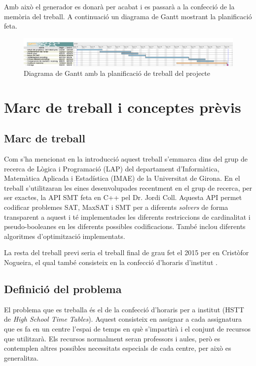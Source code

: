 \documentclass[11pt,a4paper,twoside]{report}
\begin{document}
  Amb això el generador es donarà per acabat i es passarà a la confecció de la memòria del treball. 
  A continuació un diagrama de Gantt mostrant la planificació feta.



  \begin{figure}
    \centering
    \includegraphics[angle=90,origin=c,height=0.58\textheight]{Diagrames/gantt1.png} 
    \caption{Diagrama de Gantt amb la planificació de treball del projecte}
    \label{fig:Gantt}
  \end{figure}




  \chapter{Marc de treball i conceptes prèvis}
  \section{Marc de treball}
    Com s'ha mencionat en la introducció aquest treball s'emmarca dins del grup de recerca de Lògica i Programació (LAP) del departament d'Informàtica, Matemàtica Aplicada i Estadística (IMAE) de la Universitat de Girona. 
    En el treball s'utilitzaran les eines desenvolupades recentment en el grup de recerca, per ser exactes, la API SMT feta en C++ pel Dr. Jordi Coll. 
    Aquesta API permet codificar problemes SAT, MaxSAT i SMT per a diferents \textit{solvers} de forma transparent a aquest i té implementades les diferents restriccions de cardinalitat i pseudo-booleanes en les diferents possibles codificacions. 
    També inclou diferents algoritmes d'optimització implementats.

    La resta del treball previ seria el treball final de grau fet el 2015 per en Cristòfor Nogueira, el qual també consisteix en la confecció d'horaris d'institut \cite{treballCristo}.

  \section{Definició del problema}
    El problema que es treballa és el de la confecció d'horaris per a institut (HSTT de \textit{High School Time Tables}). 
    Aquest consisteix en assignar a cada assignatura que es fa en un centre l'espai de temps en què s'impartirà i el conjunt de recursos que utilitzarà. 
    Els recursos normalment seran professors i aules, però es contemplen altres possibles necessitats especials de cada centre, per això es generalitza.
\end{document}
